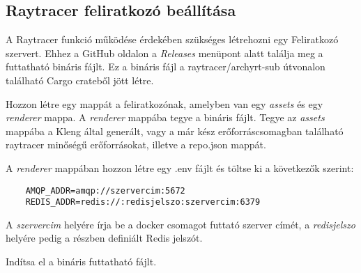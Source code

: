 \subsection{Raytracer feliratkozó beállítása}\label{subscriber}


A Raytracer funkció működése érdekében szükséges létrehozni egy Feliratkozó szervert.
Ehhez a GitHub oldalon a \emph{Releases} menüpont alatt találja meg a futtatható bináris fájlt.
Ez a bináris fájl a raytracer/archyrt-sub útvonalon található Cargo crateből jött létre.



Hozzon létre egy mappát a feliratkozónak, amelyben van egy \emph{assets} és egy \emph{renderer} mappa. A \emph{renderer} mappába tegye a bináris fájlt. Tegye az \emph{assets} mappába a Kleng által generált, vagy a már kész erőforráscsomagban található raytracer minőségű erőforrásokat, illetve a repo.json mappát. 

A \emph{renderer} mappában hozzon létre egy .env fájlt és töltse ki a következők szerint:
\begin{lstlisting}
    AMQP_ADDR=amqp://szervercim:5672
    REDIS_ADDR=redis://:redisjelszo:szervercim:6379
\end{lstlisting}

A \emph{szervercim} helyére írja be a docker csomagot futtató szerver címét, a \emph{redisjelszo} helyére pedig a \textbf{} részben definiált Redis jelszót.

Indítsa el a bináris futtatható fájlt.